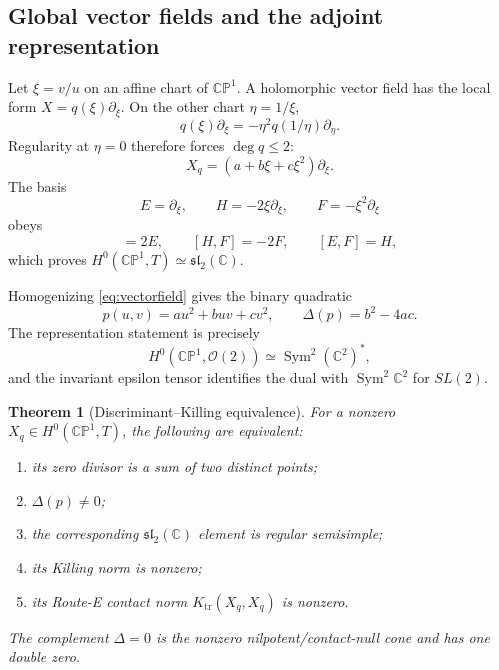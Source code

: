 \documentclass[11pt]{article}
\numberwithin{equation}{section}
\newcommand{\CP}{\mathbb{CP}}
\newcommand{\cO}{\mathcal O}
\newcommand{\sltwo}{\mathfrak{sl}_2(\mathbb C)}
\newcommand{\Ktr}{K_{\mathrm{tr}}}
\newtheorem{theorem}{Theorem}[section]
\begin{document}
\subsection{Global vector fields and the adjoint representation}

Let \(\xi=v/u\) on an affine chart of \(\CP^1\).  A holomorphic vector field
has the local form \(X=q(\xi)\partial_\xi\).  On the other chart
\(\eta=1/\xi\),
\begin{equation}
 q(\xi)\partial_\xi=-\eta^2q(1/\eta)\partial_\eta.
\end{equation}
Regularity at \(\eta=0\) therefore forces \(\deg q\le2\):
\begin{equation}
 X_q=(a+b\xi+c\xi^2)\partial_\xi.
 \label{eq:vectorfield}
\end{equation}
The basis
\begin{equation}
 E=\partial_\xi,\qquad H=-2\xi\partial_\xi,
 \qquad F=-\xi^2\partial_\xi
\end{equation}
obeys
\begin{equation}
 [H,E]=2E,\qquad[H,F]=-2F,\qquad[E,F]=H,
\end{equation}
which proves \(H^0(\CP^1,T)\simeq\sltwo\).

Homogenizing \eqref{eq:vectorfield} gives the binary quadratic
\begin{equation}
 p(u,v)=a u^2+buv+cv^2,\qquad \Delta(p)=b^2-4ac.
 \label{eq:binaryquad}
\end{equation}
The representation statement is precisely
\begin{equation}
 H^0(\CP^1,\cO(2))\simeq\operatorname{Sym}^2(\mathbb C^2)^*,
\end{equation}
and the invariant epsilon tensor identifies the dual with
\(\operatorname{Sym}^2\mathbb C^2\) for \(SL(2)\).

\begin{theorem}[Discriminant--Killing equivalence]
\label{thm:disc-killing}
For a nonzero \(X_q\in H^0(\CP^1,T)\), the following are equivalent:
\begin{enumerate}
\item its zero divisor is a sum of two distinct points;
\item \(\Delta(p)\ne0\);
\item the corresponding \(\sltwo\) element is regular semisimple;
\item its Killing norm is nonzero;
\item its Route-E contact norm \(\Ktr(X_q,X_q)\) is nonzero.
\end{enumerate}
The complement \(\Delta=0\) is the nonzero nilpotent/contact-null cone and
has one double zero.
\end{theorem}
\end{document}
